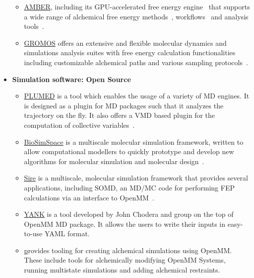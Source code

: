 \documentclass[9pt,bestpractices]{livecoms}
\begin{document}
\begin{itemize}
\begin{itemize}
	\item \href{https://ambermd.org/}{AMBER}, including its GPU-accelerated free energy engine~\cite{Lee_JChemTheoryComput_2017_v13_p3077,Giese_JChemTheoryComput_2018_v14_p1564,Lee_JChemInfModel_2018_v58_p2043} that supports a wide range of alchemical free energy methods~\cite{Tsai_JChemTheoryComput_2023_v19_p640,lee2023aces,Zhang_JChemTheoryComput_2024_v20_p3935}, workflows~\cite{Ganguly_JChemInfModel_2022_v62_p6069} and analysis tools~\cite{Giese_JChemInfModel_2025_v65_p5273,Case_JChemInfModel_2023_v63_p6183}. 
	\item \href{http://www.gromos.net/}{GROMOS} offers an extensive and flexible molecular dynamics and simulations analysis suites with free energy calculation functionalities including customizable alchemical paths and various sampling protocols~\cite{schmid2012architecture, kunz2012new, eichenberger2011gromos}.
	\end{itemize}
\item [] \textbf{Simulation software: Open Source}
	\begin{itemize}
	\item \href{https://www.plumed.org/}{PLUMED} is a tool which enables the usage of a variety of MD engines. It is designed as a plugin for MD packages such that it analyzes the trajectory on the fly. It also offers a VMD based plugin for the computation of collective variables~\cite{bonomi2019promoting}.   	
	\item \href{https://biosimspace.org/}{BioSimSpace} is a multiscale molecular simulation framework, written to allow computational modellers to quickly prototype and develop new algorithms for molecular simulation and molecular design~\cite{hedges2019biosimspace, hedges2023suite}. 
	\item \href{https://siremol.org/}{Sire} is a multiscale, molecular simulation framework that provides several applications, including SOMD, an MD/MC code for performing FEP calculations via an interface to OpenMM~\cite{woods2024sire}. 
	\item \href{http://getyank.org/latest/index.html}{YANK} is a tool developed by John Chodera and group on the top of OpenMM MD package. It allows the users to write their inputs in easy-to-use YAML format.
        \item \href{https://github.com/choderalab/openmmtools} provides tooling for creating alchemical simulations using OpenMM. These include tools for alchemically modifying OpenMM Systems, running multistate simulations and adding alchemical restraints.

\end{itemize}
\end{itemize}
\end{document}
